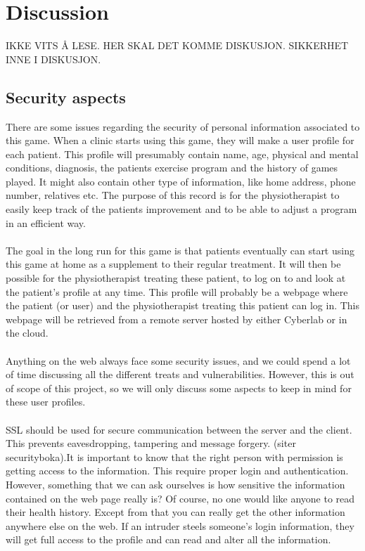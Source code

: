 \chapter{Discussion}
IKKE VITS Å LESE. HER SKAL DET KOMME DISKUSJON. SIKKERHET INNE I DISKUSJON. 
\section{Security aspects}
There are some issues regarding the security of personal information associated to this game. When a clinic starts using this game, they will make a user profile for each patient. This profile will presumably contain name, age, physical and mental conditions, diagnosis, the patients exercise program and the history of games played. It might also contain other type of information, like home address, phone number, relatives etc. The purpose of this record is for the physiotherapist to easily keep track of the patients improvement and to be able to adjust a program in an efficient way. \\ \\
The goal in the long run for this game is that patients eventually can start using this game at home as a supplement to their regular treatment. It will then be possible for the physiotherapist treating these patient, to log on to and look at the patient’s profile at any time. This profile will probably be a webpage where the patient (or user) and the physiotherapist treating this patient can log in. This webpage will be retrieved from a remote server hosted by either Cyberlab or in the cloud. \\ \\
Anything on the web always face some security issues, and we could spend a lot of time discussing all the different treats and vulnerabilities. However, this is out of scope of this project, so we will only discuss some aspects to keep in mind for these user profiles.\\ \\
SSL should be used for secure communication between the server and the client. This prevents eavesdropping, tampering and message forgery. (siter securityboka).It is important to know that the right person with permission is getting access to the information. This require proper login and authentication. However, something that we can ask ourselves is how sensitive the information contained on the web page really is? Of course, no one would like anyone to read their health history. Except from that you can really get the other information anywhere else on the web. If an intruder steels someone's login information, they will get full access to the profile and can read and alter all the information.  \\ \\
